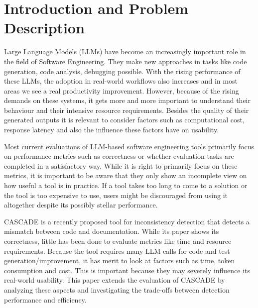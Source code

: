 \section{Introduction and Problem Description}
\label{sec:problem-description}

Large Language Models (LLMs) have become an increasingly important role in the field of Software Engineering.
They make new approaches in tasks like code generation, code analysis, debugging possible.
With the rising performance of these LLMs, the adoption in real-world workflows also increases and in most areas we see a real productivity improvement.
However, because of the rising demands on these systems, it gets more and more important to understand their behaviour and their intensive resource requirements.
Besides the quality of their generated outputs it is relevant to consider factors such as computational cost, response latency and also the influence these factors have on usability.

\vspace{0.25cm}
\noindent Most current evaluations of LLM-based software engineering tools primarily focus on performance metrics such as correctness or whether evaluation tasks are completed in a satisfactory way.
While it is right to primarily focus on these metrics, it is important to be aware that they only show an incomplete view on how useful a tool is in practice.
If a tool takes too long to come to a solution or the tool is too expensive to use, users might be discouraged from using it altogether despite its possibly stellar performance.

\vspace{0.25cm}
\noindent CASCADE \cite{Kiecker_2026} is a recently proposed tool for inconsistency detection that detects a mismatch between code and documentation.
While its paper shows its correctness, little has been done to evaluate metrics like time and  resource requirements.
Because the tool requires many LLM calls for code and test generation/improvement, it has merit to look at factors such as time, token consumption and cost.
This is important because they may severely influence its real-world usability.
This paper extends the evaluation of CASCADE \cite{Kiecker_2026} by analyzing these aspects and investigating the trade-offs between detection performance and efficiency.

